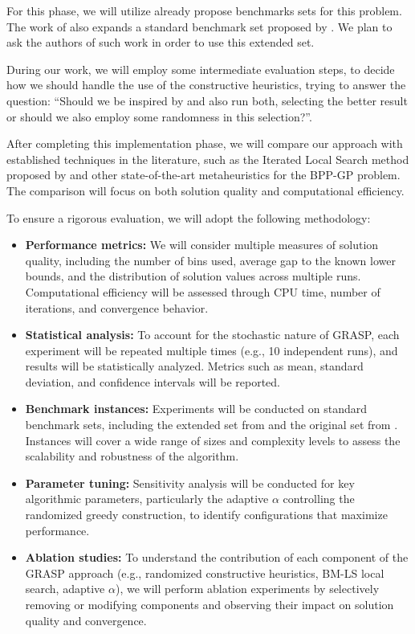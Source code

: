 \documentclass[12pt]{article}
\begin{document}
 For this phase, we will utilize already propose benchmarks sets for this problem. The work of \cite{kramer:17} also expands a standard benchmark set proposed by \cite{otto:13}. We plan to ask the authors of such work in order to use this extended set.

 During our work, we will employ some intermediate evaluation steps, to decide how we should handle the use of the constructive heuristics, trying to answer the question: ``Should we be inspired by \cite{kramer:17} and also run both, selecting the better result or should we also employ some randomness in this selection?''.

 After completing this implementation phase, we will compare our approach with established techniques in the literature, such as the Iterated Local Search method proposed by \cite{kramer:17} and other state-of-the-art metaheuristics for the BPP-GP problem. The comparison will focus on both solution quality and computational efficiency.

To ensure a rigorous evaluation, we will adopt the following methodology:
\begin{itemize}
\item \textbf{Performance metrics:} We will consider multiple measures of solution quality, including the number of bins used, average gap to 
the known lower bounds, and the distribution of solution values across multiple runs. Computational efficiency will be assessed through CPU 
time, number of iterations, and convergence behavior.
\item \textbf{Statistical analysis:} To account for the stochastic nature of GRASP, each experiment will be repeated multiple times 
(e.g., 10 independent runs), and results will be statistically analyzed. Metrics such as mean, standard deviation, and confidence intervals 
will be reported.
\item \textbf{Benchmark instances:} Experiments will be conducted on standard benchmark sets, including the extended set from 
\cite{kramer:17} and the original set from \cite{otto:13}. Instances will cover a wide range of sizes and complexity levels to assess the 
scalability and robustness of the algorithm.
\item \textbf{Parameter tuning:} Sensitivity analysis will be conducted for key algorithmic parameters, particularly the adaptive \(\alpha\) 
controlling the randomized greedy construction, to identify configurations that maximize performance.
\item \textbf{Ablation studies:} To understand the contribution of each component of the GRASP approach (e.g., randomized constructive 
heuristics, BM-LS local search, adaptive \(\alpha\)), we will perform ablation experiments by selectively removing or 
modifying components and observing their impact on solution quality and convergence.
\end{itemize}
\end{document}
